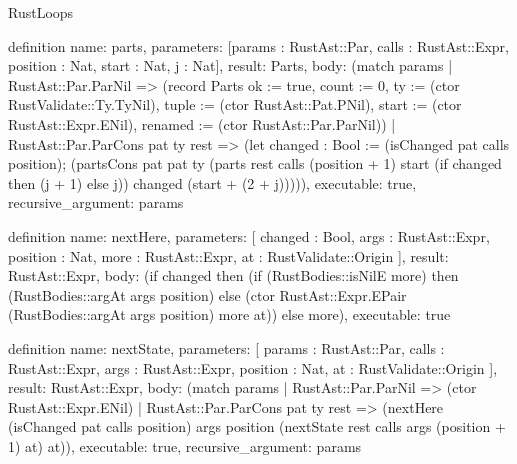 \begin{lexlean}{RustLoops}
\begin{semanticmodule}
definition{
  name: parts,
  parameters: [params : RustAst::Par, calls : RustAst::Expr, position : Nat, start : Nat, j : Nat],
  result: Parts,
  body: (match params
    | RustAst::Par.ParNil => (record Parts {ok := true, count := 0, ty := (ctor RustValidate::Ty.TyNil), tuple := (ctor RustAst::Pat.PNil), start := (ctor RustAst::Expr.ENil), renamed := (ctor RustAst::Par.ParNil)})
    | RustAst::Par.ParCons pat ty rest => (let changed : Bool := (isChanged pat calls position); (partsCons pat pat ty (parts rest calls (position + 1) start (if changed then (j + 1) else j)) changed (start + (2 + j))))),
  executable: true,
  recursive_argument: params
}

definition{
  name: nextHere,
  parameters: [
    changed : Bool,
    args : RustAst::Expr,
    position : Nat,
    more : RustAst::Expr,
    at : RustValidate::Origin
  ],
  result: RustAst::Expr,
  body: (if changed then (if (RustBodies::isNilE more) then (RustBodies::argAt args position) else (ctor RustAst::Expr.EPair (RustBodies::argAt args position) more at)) else more),
  executable: true
}

definition{
  name: nextState,
  parameters: [
    params : RustAst::Par,
    calls : RustAst::Expr,
    args : RustAst::Expr,
    position : Nat,
    at : RustValidate::Origin
  ],
  result: RustAst::Expr,
  body: (match params
    | RustAst::Par.ParNil => (ctor RustAst::Expr.ENil)
    | RustAst::Par.ParCons pat ty rest => (nextHere (isChanged pat calls position) args position (nextState rest calls args (position + 1) at) at)),
  executable: true,
  recursive_argument: params
}


\end{semanticmodule}
\end{lexlean}
